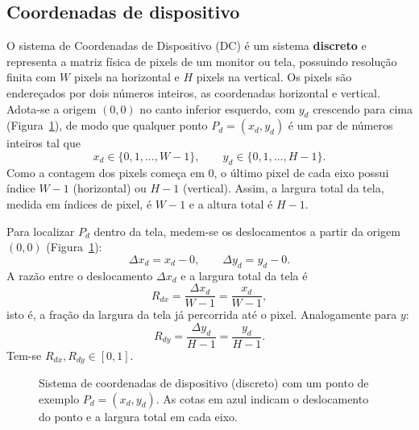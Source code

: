 \subsection{Coordenadas de dispositivo}
O sistema de Coordenadas de Dispositivo (DC) é um sistema \textbf{discreto} e representa a matriz física de pixels de um monitor ou tela, possuindo resolução finita com $W$ pixels na horizontal e $H$ pixels na vertical. Os pixels são endereçados por dois números inteiros, as coordenadas horizontal e vertical. Adota-se a origem $(0,0)$ no canto inferior esquerdo, com $y_d$ crescendo para cima (Figura~\ref{fig:dc}), de modo que qualquer ponto $P_d = (x_d, y_d)$ é um par de números inteiros tal que
\begin{equation}
    x_d \in \{0, 1, \dots, W-1\}, \qquad y_d \in \{0, 1, \dots, H-1\}.
\end{equation}
Como a contagem dos pixels começa em $0$, o último pixel de cada eixo possui índice $W-1$ (horizontal) ou $H-1$ (vertical). Assim, a largura total da tela, medida em índices de pixel, é $W-1$ e a altura total é $H-1$.

Para localizar $P_d$ dentro da tela, medem-se os deslocamentos a partir da origem $(0,0)$ (Figura~\ref{fig:dc}):
\begin{equation}
    \Delta x_d = x_d - 0, \qquad \Delta y_d = y_d - 0.
\end{equation}
A razão entre o deslocamento $\Delta x_d$ e a largura total da tela é
\begin{equation}
    R_{dx} = \frac{\Delta x_d}{W-1} = \frac{x_d}{W-1},
    \label{eq:razao-dc-x}
\end{equation}
isto é, a fração da largura da tela já percorrida até o pixel. Analogamente para $y$:
\begin{equation}
    R_{dy} = \frac{\Delta y_d}{H-1} = \frac{y_d}{H-1}.
    \label{eq:razao-dc-y}
\end{equation}
Tem-se $R_{dx}, R_{dy} \in [0,1]$.

\begin{figure}[H]
    \centering
    \caption{Sistema de coordenadas de dispositivo (discreto) com um ponto de exemplo $P_d = (x_d, y_d)$. As cotas em azul indicam o deslocamento do ponto e a largura total em cada eixo.}
    \label{fig:dc}
\end{figure}

